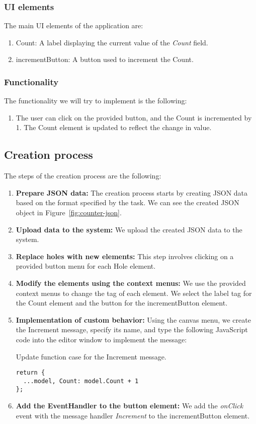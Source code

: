 \subsubsection{UI elements}
The main UI elements of the application are:
\begin{enumerate}
	\item Count: A label displaying the current value of the \emph{Count} field.
	\item incrementButton: A button used to increment the Count.
\end{enumerate}

\subsubsection{Functionality}
The functionality we will try to implement is the following:
\begin{enumerate}
	\item The user can click on the provided button, and the Count is incremented by 1. The Count element is updated to reflect the change in value.
\end{enumerate}
\medskip
\subsection {Creation process}

The steps of the creation process are the following:
\begin{enumerate}
	\item \textbf{Prepare JSON data:} The creation process starts by creating JSON data based on the format specified by the task.
	      We can see the created JSON object in Figure~\ref{fig:counter-json}.
	\item \textbf{Upload data to the system:} We upload the created JSON data to the system.
	\item \textbf{Replace holes with new elements:} This step involves clicking on a provided button menu for each Hole element.
	\item \textbf{Modify the elements using the context menus:} We use the provided context menus to change the tag of each element.
	      We select the label tag for the Count element and the button for the incrementButton element.
	\item \textbf{Implementation of custom behavior:} Using the canvas menu, we create the Increment message, specify its name, and type the following JavaScript code into the editor window to implement the message:
	      \begin{listing}[htbp]
		      \caption{Update function case for the Increment message.}
		      \begin{lstlisting}
return {
  ...model, Count: model.Count + 1
};
            \end{lstlisting}
	      \end{listing}
	\item \textbf{Add the EventHandler to the button element:} We add the \emph{onClick} event with the message handler \emph{Increment} to the incrementButton element.
\end{enumerate}


